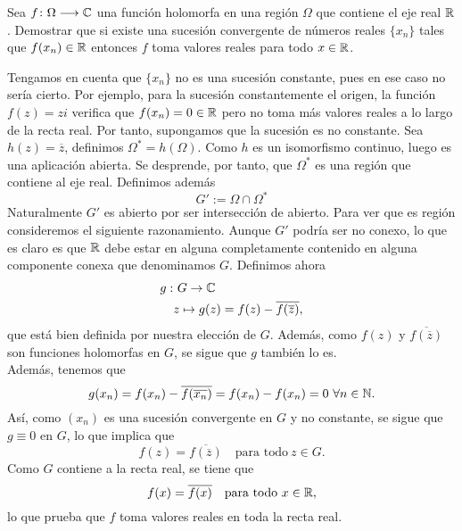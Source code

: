 \documentclass[twoside]{article}
\begin{document}
\begin{ejercicio}{5}
Sea $f\colon{\Omega}\longrightarrow{\mathbb{C}}$ una función holomorfa en una región $\Omega$ que contiene el eje real $\mathbb{R}$. Demostrar que si existe una sucesión convergente de números reales $\{x_n\}$ tales que $f(x_n)\in \mathbb{R}$ entonces $f$ toma valores reales para todo $x\in \mathbb{R}$.
\end{ejercicio}
\begin{solucion}
Tengamos en cuenta que $\{x_n\}$ no es una sucesión constante, pues en ese caso no sería cierto. Por ejemplo, para la sucesión constantemente el origen, la función $f(z)=zi$ verifica que $f(x_n)=0\in \mathbb{R}$ pero no toma más valores reales a lo largo de la recta real. Por tanto, supongamos que la sucesión es no constante. Sea $h(z)=\overline{z}$, definimos $\Omega^* = h(\Omega)$. Como $h$ es un isomorfismo continuo, luego es una aplicación abierta. Se desprende, por tanto, que $\Omega^*$ es una región que contiene al eje real. Definimos además
$$
G':=\Omega \cap \Omega^*
$$
Naturalmente $G'$ es abierto por ser intersección de abierto. Para ver que es región consideremos el siguiente razonamiento.  Aunque $G'$ podría ser no conexo, lo que es claro es que $\mathbb{R}$ debe estar en alguna completamente contenido en alguna componente conexa que denominamos $G$. Definimos ahora \begin{equation*}\begin{split}
	g : & \  G \rightarrow \mathbb{C} \\
	& z \mapsto g(z) = f(z) - \overline{f(\overline{z})},
	\end{split}
	\end{equation*}
	que está bien definida por nuestra elección de $G$. Además, como $f(z)$ y $ \overline{f(\overline{z})}$ son funciones holomorfas en $G$, se sigue que $g$ también lo es. \\
	Además, tenemos que \begin{equation*}
	g(x_n) = f(x_n) - \overline{f(\overline{x_n})} = f(x_n) - f(x_n) = 0 \  \forall n \in \mathbb{N}.
	\end{equation*}
	Así, como $(x_n)$ es una sucesión convergente en $G$ y no constante, se sigue que $g \equiv 0$ en $G$, lo que implica que \begin{equation*}
	f(z) = \overline{f(\overline{z})} \quad \text{para todo} \ z \in G.
	\end{equation*}
	Como $G$ contiene a la recta real, se tiene que \begin{equation*}
	f(x) = \overline{f(x)} \quad \text{para todo} \ x \in \mathbb{R},
	\end{equation*}
	lo que prueba que $f$ toma valores reales en toda la recta real. 
\end{solucion}
\newpage
\end{document}
